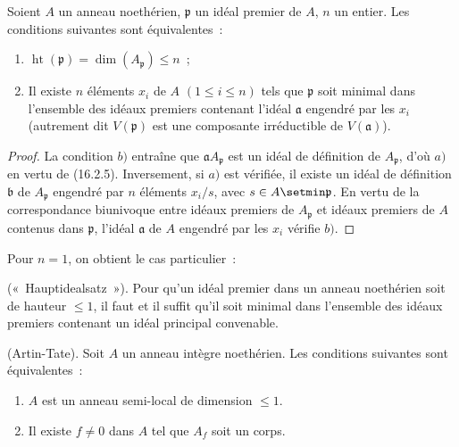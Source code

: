 \begin{proposition}[16.3.1]
\label{0.16.3.1-fr}
Soient $A$ un anneau noethérien, $\mathfrak{p}$ un idéal premier de $A$, $n$ un
entier. Les conditions suivantes sont équivalentes~:
\begin{enumerate}
  \item[{\upshape a)}] $\operatorname{ht}(\mathfrak{p})=
  \dim(A_{\mathfrak{p}})\leq n$~;
  \item[{\upshape b)}] Il existe $n$ éléments $x_i$ de $A$ $(1\leq i\leq n)$ tels que
  $\mathfrak{p}$ soit minimal dans l'ensemble des idéaux premiers contenant
  l'idéal $\mathfrak{a}$ engendré par les $x_i$ \textup{(autrement dit}
  $V(\mathfrak{p})$ est une composante irréductible de $V(\mathfrak{a})$).
\end{enumerate}
\end{proposition}

\begin{proof}
La condition $b)$ entraîne que $\mathfrak{a}A_{\mathfrak{p}}$ est un idéal de
définition de $A_{\mathfrak{p}}$, d'où $a)$ en vertu de (16.2.5).
Inversement, si $a)$ est vérifiée, il existe un idéal de définition
$\mathfrak{b}$ de $A_{\mathfrak{p}}$ engendré par $n$ éléments $x_i/s$, avec
$s\in A\setmin\mathfrak{p}$. En vertu de la correspondance biunivoque entre idéaux
premiers de $A_{\mathfrak{p}}$ et idéaux premiers de $A$ contenus dans
$\mathfrak{p}$, l'idéal $\mathfrak{a}$ de $A$ engendré par les $x_i$ vérifie
$b)$.
\end{proof}


Pour $n=1$, on obtient le cas particulier~:

\begin{corollary}[16.3.2]
\label{0.16.3.2-fr}
\textup{(«~Hauptidealsatz~»).}
Pour qu'un idéal premier dans un anneau noethérien soit de hauteur $\leq1$, il
faut et il suffit qu'il soit minimal dans l'ensemble des idéaux premiers
contenant un idéal principal convenable.
\end{corollary}

\begin{corollary}[16.3.3]
\label{0.16.3.3-fr}
\textup{(Artin-Tate).}
Soit $A$ un anneau intègre noethérien. Les conditions suivantes sont
équivalentes~:
\begin{enumerate}
  \item[{\upshape a)}] $A$ est un anneau semi-local de dimension $\leq1$.
  \item[{\upshape b)}] Il existe $f\neq0$ dans $A$ tel que $A_f$ soit un corps.
\end{enumerate}
\end{corollary}

